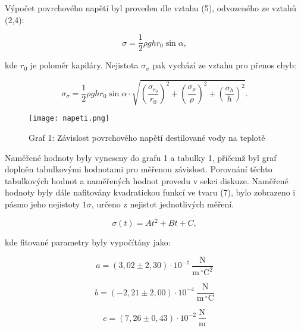 \documentclass{prepareprotokol} %
\begin{document}
Výpočet povrchového napětí byl proveden dle vztahu (5), odvozeného ze vztahů (2,4):

\begin{equation}
\sigma = \frac{1}{2} \rho g h r_0 \sin\alpha,
\end{equation}

kde $r_0$ je poloměr kapiláry. Nejistota $\sigma_\sigma$ pak vychází ze vztahu pro přenos chyb:

\begin{equation}
\sigma_\sigma = \frac{1}{2} \rho g h r_0 \sin\alpha \cdot 
\sqrt{
\left(\frac{\sigma_{r_0}}{r_0}\right)^2 +
\left(\frac{\sigma_\rho}{\rho}\right)^2 +
\left(\frac{\sigma_h}{h}\right)^2
}.
\end{equation}

\begin{figure}[h!]
    \centering
    \texttt{[image: napeti.png]}
    \caption{Graf 1: Závislost povrchového napětí destilované vody na teplotě}
    \label{fig:napeti}
\end{figure}

Naměřené hodnoty byly vyneseny do grafu 1 a tabulky 1, přičemž byl graf doplněn tabulkovými hodnotami \cite{tabulky1980}
 pro měřenou závislost. Porovnání těchto tabulkových hodnot a naměřených hodnot provedu v sekci diskuze. Naměřené hodnoty byly dále nafitovány kvadratickou funkcí ve tvaru (7), bylo zobrazeno i pásmo jeho nejistoty $1\sigma$, určeno z nejistot jednotlivých měření. 

\begin{equation}
\sigma(t) =A t^2 + B t + C,
\end{equation}

\vspace{1000px}

kde fitované parametry byly vypočítány jako:

\begin{equation}
a = (3{,}02 \pm 2{,}30) \cdot 10^{-7}\ \mathrm{\frac{N}{m\,^\circ C^2}}
\end{equation}

\begin{equation}
b = (-2{,}21 \pm 2{,}00) \cdot 10^{-4}\ \mathrm{\frac{N}{m\,^\circ C}}
\end{equation}

\begin{equation}
c = (7{,}26 \pm 0{,}43) \cdot 10^{-2}\ \mathrm{\frac{N}{m}}
\end{equation}
\end{document}
